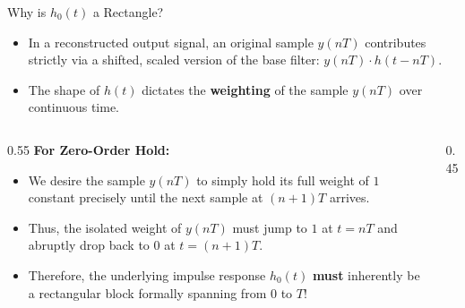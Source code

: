 \begin{frame}{Why is $h_0(t)$ a Rectangle?}
  \begin{itemize}
    \item In a reconstructed output signal, an original sample $y(nT)$ contributes strictly via a shifted, scaled version of the base filter: $y(nT) \cdot h(t - nT)$.
    \item The shape of $h(t)$ dictates the \textbf{weighting} of the sample $y(nT)$ over continuous time.
  \end{itemize}
  \vspace{0.2cm}
  \begin{columns}
    \begin{column}{0.55\textwidth}
      \textbf{For Zero-Order Hold:}
      \begin{itemize}
        \item We desire the sample $y(nT)$ to simply hold its full weight of $1$ constant precisely until the next sample at $(n+1)T$ arrives.
        \item Thus, the isolated weight of $y(nT)$ must jump to $1$ at $t = nT$ and abruptly drop back to $0$ at $t = (n+1)T$.
        \item Therefore, the underlying impulse response $h_0(t)$ \textbf{must} inherently be a rectangular block formally spanning from $0$ to $T$!
      \end{itemize}
    \end{column}
    \begin{column}{0.45\textwidth}
      \centering
    \end{column}
  \end{columns}
\end{frame}

